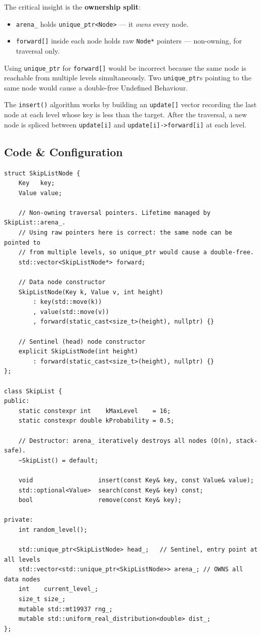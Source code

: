 \documentclass[11pt,a4paper]{article}
\begin{document}
The critical insight is the \textbf{ownership split}:
\begin{itemize}[noitemsep]
    \item \texttt{arena\_} holds \texttt{unique\_ptr<Node>} --- it \emph{owns} every node.
    \item \texttt{forward[]} inside each node holds raw \texttt{Node*} pointers --- non-owning, for traversal only.
\end{itemize}

Using \texttt{unique\_ptr} for \texttt{forward[]} would be incorrect because
the same node is reachable from multiple levels simultaneously. Two
\texttt{unique\_ptr}s pointing to the same node would cause a double-free
Undefined Behaviour.

The \texttt{insert()} algorithm works by building an \texttt{update[]}
vector recording the last node at each level whose key is less than the
target. After the traversal, a new node is spliced between
\texttt{update[i]} and \texttt{update[i]->forward[i]} at each level.

\subsection{Code \& Configuration}

\begin{lstlisting}[style=cpp, caption={Skip List Node and Class Declaration: \texttt{include/kvault/skiplist.hpp}}]
struct SkipListNode {
    Key   key;
    Value value;

    // Non-owning traversal pointers. Lifetime managed by SkipList::arena_.
    // Using raw pointers here is correct: the same node can be pointed to
    // from multiple levels, so unique_ptr would cause a double-free.
    std::vector<SkipListNode*> forward;

    // Data node constructor
    SkipListNode(Key k, Value v, int height)
        : key(std::move(k))
        , value(std::move(v))
        , forward(static_cast<size_t>(height), nullptr) {}

    // Sentinel (head) node constructor
    explicit SkipListNode(int height)
        : forward(static_cast<size_t>(height), nullptr) {}
};

class SkipList {
public:
    static constexpr int    kMaxLevel    = 16;
    static constexpr double kProbability = 0.5;

    // Destructor: arena_ iteratively destroys all nodes (O(n), stack-safe).
    ~SkipList() = default;

    void                  insert(const Key& key, const Value& value);
    std::optional<Value>  search(const Key& key) const;
    bool                  remove(const Key& key);

private:
    int random_level();

    std::unique_ptr<SkipListNode> head_;   // Sentinel, entry point at all levels
    std::vector<std::unique_ptr<SkipListNode>> arena_; // OWNS all data nodes
    int    current_level_;
    size_t size_;
    mutable std::mt19937 rng_;
    mutable std::uniform_real_distribution<double> dist_;
};
\end{lstlisting}
\end{document}
